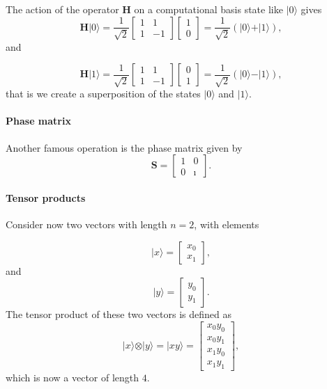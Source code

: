 The action of the operator $\bm{H}$ on a computational basis state like $\vert 0\rangle$ gives
\[
\bm{H}\vert 0 \rangle = \frac{1}{\sqrt{2}}\begin{bmatrix} 1 & 1 \\ 1 & -1\end{bmatrix}\begin{bmatrix} 1 \\ 0\end{bmatrix}=\frac{1}{\sqrt{2}}(\vert 0\rangle + \vert 1\rangle),
\]
and 

\[
\bm{H}\vert 1 \rangle = \frac{1}{\sqrt{2}}\begin{bmatrix} 1 & 1 \\ 1 & -1\end{bmatrix}\begin{bmatrix} 0 \\ 1\end{bmatrix}=\frac{1}{\sqrt{2}}(\vert 0\rangle - \vert 1\rangle),
\]
that is we create a superposition of the states $\vert 0\rangle$ and $\vert 1\rangle$.


\paragraph{Phase matrix}
Another famous operation is the phase matrix given by
\[
\bm{S} = \begin{bmatrix} 1 & 0 \\ 0 & \imath\end{bmatrix}.
\]


\paragraph{Tensor products}

Consider now two vectors with length $n=2$, with elements

\[
\vert x \rangle = \begin{bmatrix} x_0 \\ x_1 \end{bmatrix}, 
\]
and
\[
\vert y \rangle = \begin{bmatrix} y_0 \\ y_1 \end{bmatrix}. 
\]
The tensor product of these two vectors is defined as
\[
\vert x \rangle \otimes \vert y \rangle = \vert xy \rangle  = \begin{bmatrix} x_0y_0 \\ x_0y_1 \\ x_1y_0 \\ x_1y_1 \end{bmatrix}, 
\]
which is now a vector of length $4$.


